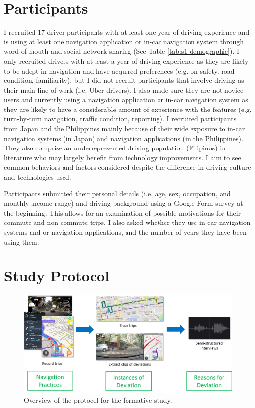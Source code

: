 \section{Participants} 
I recruited 17 driver participants with at least one year of driving experience and is using at least one navigation application or in-car navigation system through word-of-mouth and social network sharing (See Table \ref{tab:s1-demographic}). I only recruited drivers with at least a year of driving experience as they are likely to be adept in navigation and have acquired preferences (e.g. on safety, road condition, familiarity), but I did not recruit participants that involve driving as their main line of work (i.e. Uber drivers). I also made sure they are not novice users and currently using a navigation application or in-car navigation system as they are likely to have a considerable amount of experience with the features (e.g. turn-by-turn navigation, traffic condition, reporting). I recruited participants from Japan and the Philippines mainly because of their wide exposure to in-car navigation systems (in Japan) and navigation applications (in the Philippines). They also comprise an underrepresented driving population (Filipinos) in literature who may largely benefit from technology improvements. I aim to see common behaviors and factors considered despite the difference in driving culture and technologies used.  

Participants submitted their personal details (i.e. age, sex, occupation, and monthly income range) and driving background using a Google Form survey at the beginning. This allows for an examination of possible motivations for their commute and non-commute trips. I also asked whether they use in-car navigation systems and or navigation applications, and the number of years they have been using them. 

\section{Study Protocol}

\begin{figure}[t]
  \centering
  \includegraphics[scale=0.4]{figures/s1-method.png}
  \caption{Overview of the protocol for the formative study.}
  \label{fig:s1-method}
\end{figure}

